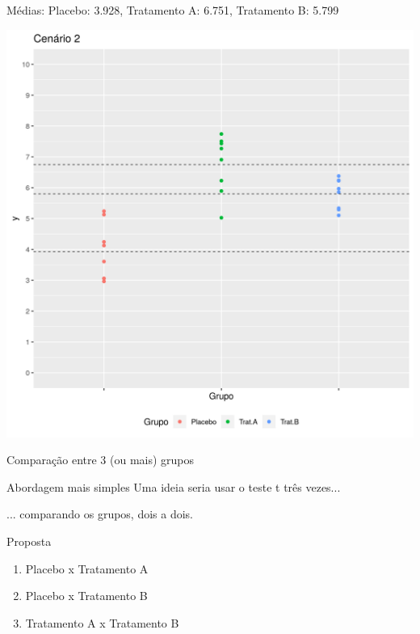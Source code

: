 \documentclass{beamer}
\begin{document}
\begin{frame}{\footnotesize Médias: Placebo: 3.928, Tratamento A: 6.751, Tratamento B: 5.799}
  \begin{center}
    \includegraphics[height=.9\textheight]{Cap13-30/cenario2_medias}

  \end{center}
\end{frame}

\begin{frame}{\small Comparação entre 3 (ou mais) grupos}
  \begin{block}{Abordagem mais simples}
    \small
    Uma ideia seria usar o teste t três vezes...

    \bigskip
    ... comparando os grupos, dois a dois.
  \end{block}
  \vfill
  \begin{block}{Proposta}
    \begin{enumerate}
      \footnotesize
    \item Placebo x Tratamento A
    \item Placebo x Tratamento B
    \item Tratamento A x Tratamento B
    \end{enumerate}
  \end{block}
\end{frame}
\end{document}
